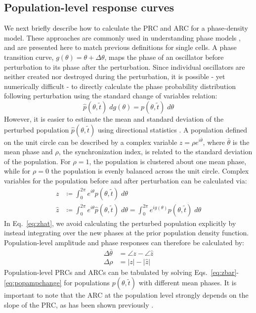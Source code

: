 \documentclass[11pt, letterpaper]{article}
\begin{document}
\subsection*{Population-level response curves}

We next briefly describe how to calculate the PRC and ARC for a phase-density model.
These approaches are commonly used in understanding phase models \cite{Kuramoto1984, Ukai2007}, and are presented here to match previous definitions for single cells.
A phase transition curve, $g(\theta) = \theta + \Delta\theta$, maps the phase of an oscillator before perturbation to its phase after the perturbation.
Since individual oscillators are neither created nor destroyed during the perturbation, it is possible - yet numerically difficult - to directly calculate the phase probability distribution following perturbation using the standard change of variables relation:
\begin{equation}
  \hat{p}(\theta, \tilde{t})\; dg(\theta) = p(\theta, \tilde{t})\; d\theta
  \label{eq:pdfinversion}
\end{equation}
However, it is easier to estimate the mean and standard deviation of the perturbed population $\hat{p}(\theta, \tilde{t})$ using directional statistics \cite{Mardia2009}.
A population defined on the unit circle can be described by a complex variable $z = \rho e^{i\bar{\theta}}$, where $\bar{\theta}$ is the mean phase and $\rho$, the synchronization index, is related to the standard deviation of the population.
For $\rho = 1$, the population is clustered about one mean phase, while for $\rho = 0$ the population is evenly balanced across the unit circle.
Complex variables for the population before and after perturbation can be calculated via:
\begin{align}
  z &\coloneqq \int_0^{2\pi} e^{i\theta} p(\theta, \tilde{t}) \; d\theta \label{eq:zbar}\\
  \hat{z} &\coloneqq  \int_0^{2\pi} e^{i\theta} \hat{p}(\theta, \tilde{t}) \; d\theta =
  \int_0^{2\pi} e^{i g(\theta)} p(\theta, \tilde{t}) \; d\theta
  \label{eq:zhat}
\end{align}
In Eq.~\ref{eq:zhat}, we avoid calculating the perturbed population explicitly by instead integrating over the new phases at the prior population density function.
Population-level amplitude and phase responses can therefore be calculated by:
\begin{align}
  \Delta \bar{\theta} &= \angle z - \angle \hat{z} \\
  \Delta \rho &= |z| - |\hat{z}|
  \label{eq:popampchange}
\end{align}
Population-level PRCs and ARCs can be tabulated by solving Eqs.~\ref{eq:zbar}-\ref{eq:popampchange} for populations $p(\theta, \tilde{t})$ with different mean phases.
It is important to note that the ARC at the population level strongly depends on the slope of the PRC, as has been shown previously \cite{Ukai2007}.
\end{document}
